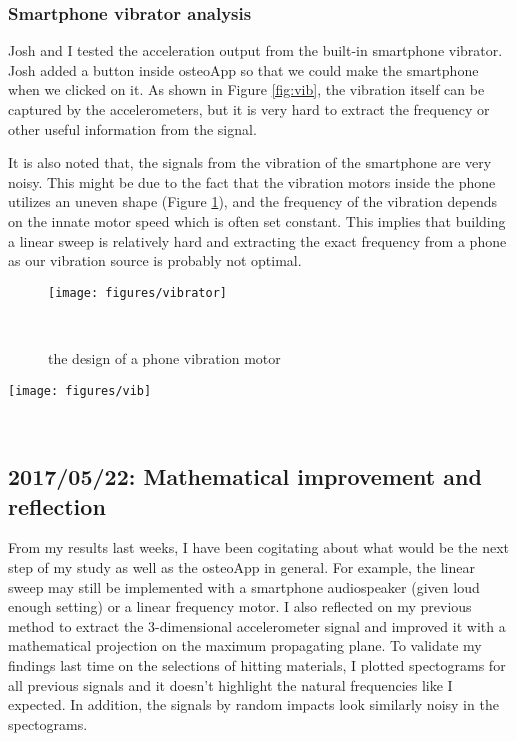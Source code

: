 \documentclass{sigchi}
\begin{document}
\subsubsection{Smartphone vibrator analysis} 

Josh and I tested the acceleration output from the built-in smartphone vibrator. Josh added a button inside osteoApp so that we could make the smartphone when we clicked on it. As shown in Figure \ref{fig:vib}, the vibration itself can be captured by the accelerometers, but it is very hard to extract the frequency or other useful information from the signal.

It is also noted that, the signals from the vibration of the smartphone are very noisy. This might be due to the fact that the vibration motors inside the phone utilizes an uneven shape (Figure \ref{fig:vibrator}), and the frequency of the vibration depends on the innate motor speed which is often set constant. This implies that building a linear sweep is relatively hard and extracting the exact frequency from a phone as our vibration source is probably not optimal.

\begin{figure}
\centering
  \texttt{[image: figures/vibrator]}
  \caption{the design of a phone vibration motor}~\label{fig:vibrator}
\end{figure}

\begin{figure*}
  \centering
  \texttt{[image: figures/vib]}
  \caption{accelerometer signals vs. time in smartphone vibrator analysis in take 1~4.}
    ~\label{fig:vib}
\end{figure*}


\subsection{2017/05/22: Mathematical improvement and reflection}

From my results last weeks, I have been cogitating about what would be the next step of my study as well as the osteoApp in general. For example, the linear sweep may still be implemented with a smartphone audiospeaker (given loud enough setting) or a linear frequency motor. I also reflected on my previous method to extract the 3-dimensional accelerometer signal and improved it with a mathematical projection on the maximum propagating plane. To validate my findings last time on the selections of hitting materials, I plotted spectograms for all previous signals and it doesn't highlight the natural frequencies like I expected. In addition, the signals by random impacts look similarly noisy in the spectograms.
\end{document}
